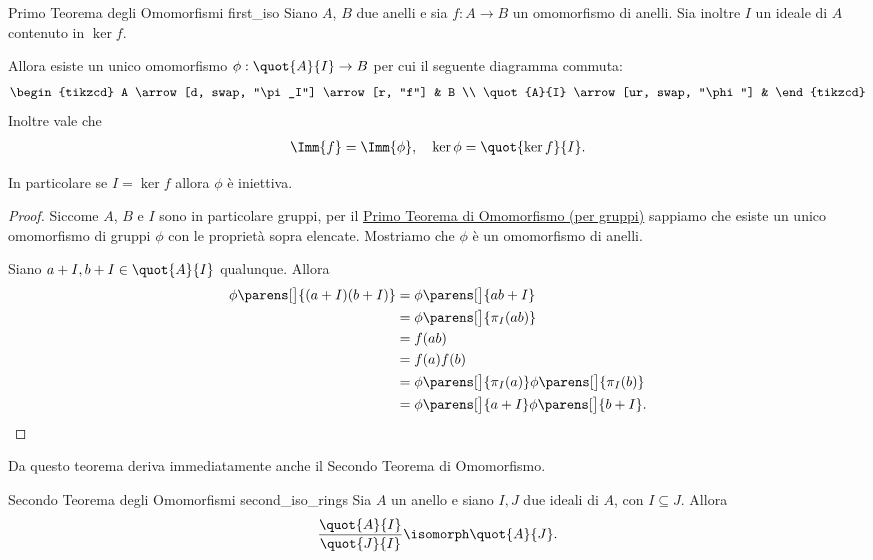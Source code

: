 \begin{theorem}
    {Primo Teorema degli Omomorfismi} {first_iso}
    Siano $A$, $B$ due anelli e sia $f : A \to B$ un omomorfismo di anelli. Sia inoltre $I$ un ideale di $A$ contenuto in $\ker f$.

    Allora esiste un unico omomorfismo $\phi : \quot{A}{I} \to B$ per cui il seguente diagramma commuta:
    \begin{equation}
        \begin{tikzcd}
            A \arrow[d, swap, "\pi_I"] \arrow[r, "f"] & B \\
            \quot{A}{I} \arrow[ur, swap, "\phi"] &
        \end{tikzcd}
    \end{equation}
    Inoltre vale che \begin{align*}
        \Imm{f} = \Imm{\phi}, \quad \ker \phi = \quot{\ker f}{I}.
    \end{align*}

    In particolare se $I = \ker f$ allora $\phi$ è iniettiva.
\end{theorem}
\begin{proof}
    Siccome $A$, $B$ e $I$ sono in particolare gruppi, per il \hyperref[th:first_iso]{Primo Teorema di Omomorfismo (per gruppi)} sappiamo che esiste un unico omomorfismo di gruppi $\phi$ con le proprietà sopra elencate. Mostriamo che $\phi$ è un omomorfismo di anelli.

    Siano $a + I, b + I \in \quot{A}{I}$ qualunque. Allora \begin{align*}
        \phi\parens[\big]{(a+I)(b +I)} &= \phi\parens[\big]{ab + I}\\
        &= \phi\parens[\big]{\pi_I(ab)}\\
        &= f(ab)\\
        &= f(a)f(b)\\
        &= \phi\parens[\big]{\pi_I(a)}\phi\parens[\big]{\pi_I(b)}\\
        &= \phi\parens[\big]{a+I}\phi\parens[\big]{b+I}. \qedhere
    \end{align*}
\end{proof}

Da questo teorema deriva immediatamente anche il Secondo Teorema di Omomorfismo.
\begin{theorem}
    {Secondo Teorema degli Omomorfismi} {second_iso_rings}
    Sia $A$ un anello e siano $I, J$ due ideali di $A$, con $I \subseteq J$. Allora \begin{equation}
        \frac{\quot{A}{I}}{\quot{J}{I}} \isomorph \quot{A}{J}.
    \end{equation}
\end{theorem}

